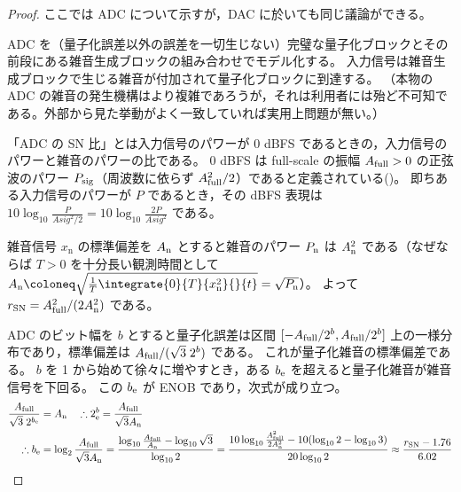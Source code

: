         \begin{proof}
            \quad\par
            ここでは ADC について示すが，DAC に於いても同じ議論ができる。\par
            ADC を（量子化誤差以外の誤差を一切生じない）完璧な量子化ブロックとその前段にある雑音生成ブロックの組み合わせでモデル化する。
            入力信号は雑音生成ブロックで生じる雑音が付加されて量子化ブロックに到達する。
            （本物の ADC の雑音の発生機構はより複雑であろうが，それは利用者には殆ど不可知である。外部から見た挙動がよく一致していれば実用上問題が無い。）
            \par
            「ADC の SN 比」とは入力信号のパワーが 0 dBFS であるときの，入力信号のパワーと雑音のパワーの比である。
            0 dBFS は full-scale の振幅 $A_\text{full}>0$ の正弦波のパワー $P_\text{sig}$（周波数に依らず $A_\text{full}^2/2$）であると定義されている(\cite{dBFS})。
            即ちある入力信号のパワーが $P$ であるとき，その dBFS 表現は $10\log_{10} \frac{P}{Asig^2/2} = 10\log_{10} \frac{2P}{Asig^2}$ である。
            \par
            雑音信号 $x_\text{n}$ の標準偏差を $A_\text{n}$ とすると雑音のパワー $P_\text{n}$ は $A_\text{n}^2$ である（なぜならば $T>0$ を十分長い観測時間として $\An\coloneq\sqrt{\frac{1}{T}\integrate{0}{T}{x_\text{n}^2}{}{t}} = \sqrt{\Pn}$）。
            よって $r_\text{SN} = A_\text{full}^2/(2A_\text{n}^2)$ である。
            \par
            ADC のビット幅を $b$ とすると量子化誤差は区間 $[-A_\text{full}/2^b,A_\text{full}/2^b]$ 上の一様分布であり，標準偏差は $A_\text{full}/(\sqrt{3}\;2^b)$ である。
            これが量子化雑音の標準偏差である。
            $b$ を 1 から始めて徐々に増やすとき，ある $b_\text{e}$ を超えると量子化雑音が雑音信号を下回る。
            この $b_\text{e}$ が ENOB であり，次式が成り立つ。
            \begin{align*}
                \frac{A_\text{full}}{\sqrt{3}\;2^{b_\text{e}}} &= A_\text{n} \quad \therefore 2^b_\text{e} = \frac{A_\text{full}}{\sqrt{3}A_\text{n}} \\
                \therefore b_\text{e} &= \log_2 \frac{A_\text{full}}{\sqrt{3}A_\text{n}} = \frac{\log_{10}\frac{A_\text{full}}{A_\text{n}} - \log_{10}\sqrt{3}}{\log_{10} 2} = \frac{10\log_{10}\frac{A_\text{full}^2}{2A_\text{n}^2} - 10(\log_{10}2 - \log_{10}3)}{20\log_{10} 2} \approx \frac{r_\text{SN} - 1.76}{6.02}
            \end{align*}
        \end{proof}